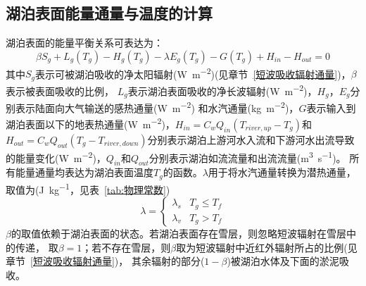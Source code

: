 \subsection{湖泊表面能量通量与温度的计算}\label{湖泊表面能量通量与温度的计算}
湖泊表面的能量平衡关系可表达为：
\begin{equation}
\beta S_{g}+L_{g}\left(T_{g}\right)-H_{g}\left(T_{g}\right)-\lambda E_{g}\left(T_{g}\right)-G\left(T_{g}\right)+H_{in}-H_{out}=0
\end{equation}
其中$S_g$表示可被湖泊吸收的净太阳辐射(\unit{W.m^{-2}})(见章节~\ref{短波吸收辐射通量})，$\beta$表示被表面吸收的比例，
$L_g$表示湖泊表面吸收的净长波辐射(\unit{W.m^{-2}})，$H_g$，$E_g$分别表示陆面向大气输送的感热通量(\unit{W.m^{-2}})
和水汽通量(\unit{kg.m^{-2}})，$G$表示输入到湖泊表面以下的地表热通量(\unit{W.m^{-2}})，$H_{in}=C_wQ_{in}(T_{river,up}-T_g)$和$H_{out}=C_wQ_{out}(T_g-T_{river,down})$分别表示湖泊上游河水入流和下游河水出流导致的能量变化(\unit{W.m^{-2}})，$Q_{in}$和$Q_{out}$分别表示湖泊如流流量和出流流量(\unit{m^{3}.s^{-1}})。
所有能量通量均表达为湖泊表面温度$T_g$的函数。$\lambda$用于将水汽通量转换为潜热通量，取值为(\unit{J.kg^{-1}}，见表~\ref{tab:物理常数})
\begin{equation}
\lambda=\left\{\begin{array}{ll}\lambda_{s} & T_{g} \leqslant T_{f} \\ \lambda_{v} & T_{g}>T_{f}\end{array}\right.
\end{equation}
$\beta$的取值依赖于湖泊表面的状态。若湖泊表面存在雪层，则忽略短波辐射在雪层中的传递，
取$\beta=1$；若不存在雪层，则$\beta$取为短波辐射中近红外辐射所占的比例(见章节~\ref{短波吸收辐射通量})，
其余辐射的部分($1-\beta$)被湖泊水体及下面的淤泥吸收。



